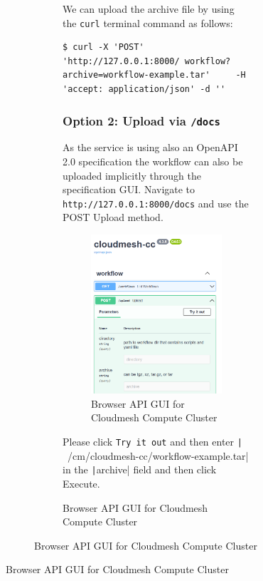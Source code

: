 \begin{figure}[htb]
\begin{figure}[htb]
\begin{figure}[htb]
We can upload the archive file by using the \texttt{curl} terminal
command as follows:

\smallskip
\begin{verbatim}
$ curl -X 'POST' 'http://127.0.0.1:8000/ workflow?archive=workflow-example.tar'     -H 'accept: application/json' -d ''
\end{verbatim}
\smallskip

\subsubsection{\texorpdfstring{Option 2: Upload via
\texttt{/docs}}{Option 2: Upload via /docs}}\label{option-2-upload-via-docs}

As the service is using also an OpenAPI 2.0 specification the workflow
can also be uploaded implicitly through the specification GUI. Navigate
to \texttt{http://127.0.0.1:8000/docs} and use the POST Upload method.

\begin{figure}
\centering
\includegraphics[width=0.7\columnwidth]{images/upload_api.png}
\caption{Browser API GUI for Cloudmesh Compute Cluster}
\end{figure}

Please click \texttt{Try\ it\ out} and then enter \newline
\texttt|~/cm/cloudmesh-cc/workflow-example.tar| in the
\texttt|archive| field and then click Execute.


\end{figure}
\end{figure}
\end{figure}
